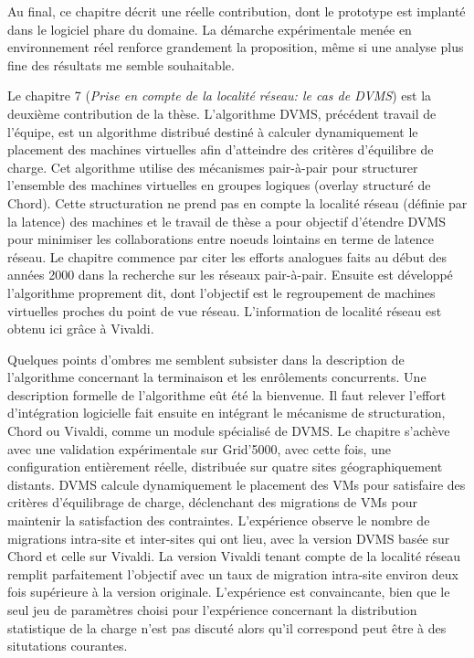 \documentclass[a4paper,12pt]{article}
\begin{document}
Au final,  ce chapitre  décrit une  réelle contribution,  dont le  prototype est
implanté dans le  logiciel phare du domaine. La démarche  expérimentale menée en
environnement réel renforce grandement la  proposition, même si une analyse plus
fine des résultats me semble souhaitable.


Le chapitre 7 (\emph{Prise en compte de la localité réseau: le cas de DVMS}) est
la deuxième  contribution de la  thèse. L'algorithme DVMS, précédent  travail de
l'équipe,  est  un algorithme  distribué  destiné  à calculer  dynamiquement  le
placement des machines  virtuelles afin d'atteindre des  critères d'équilibre de
charge.   Cet  algorithme utilise  des  mécanismes  pair-à-pair pour  structurer
l'ensemble des  machines virtuelles  en groupes  logiques (overlay  structuré de
Chord).  Cette structuration ne prend pas  en compte la localité réseau (définie
par la latence)  des machines et le  travail de thèse a  pour objectif d'étendre
DVMS  pour minimiser  les  collaborations  entre noeuds  lointains  en terme  de
latence réseau.  Le  chapitre commence par citer les efforts  analogues faits au
début des  années 2000 dans la  recherche sur les réseaux  pair-à-pair.  Ensuite
est développé l'algorithme  proprement dit, dont l'objectif  est le regroupement
de machines virtuelles proches du point de vue réseau. L'information de localité
réseau est obtenu ici grâce à Vivaldi.

Quelques  points  d'ombres   me  semblent  subsister  dans   la  description  de
l'algorithme  concernant la  terminaison  et les  enrôlements concurrents.   Une
description  formelle de  l'algorithme eût  été la  bienvenue.  Il  faut relever
l'effort  d'intégration logicielle  fait ensuite  en intégrant  le mécanisme  de
structuration,  Chord  ou Vivaldi,  comme  un  module  spécialisé de  DVMS.   Le
chapitre s'achève  avec une validation  expérimentale sur Grid'5000,  avec cette
fois,  une  configuration  entièrement   réelle,  distribuée  sur  quatre  sites
géographiquement distants. DVMS calcule dynamiquement  le placement des VMs pour
satisfaire des critères  d'équilibrage de charge, déclenchant  des migrations de
VMs pour  maintenir la  satisfaction des  contraintes.  L'expérience  observe le
nombre de  migrations intra-site et  inter-sites qui  ont lieu, avec  la version
DVMS basée sur Chord  et celle sur Vivaldi. La version  Vivaldi tenant compte de
la localité  réseau remplit  parfaitement l'objectif avec  un taux  de migration
intra-site environ deux fois supérieure à la version originale. L'expérience est
convaincante,  bien que  le  seul  jeu de  paramètres  choisi pour  l'expérience
concernant  la distribution  statistique de  la charge  n'est pas  discuté alors
qu'il correspond peut être à des situtations courantes.
\end{document}
